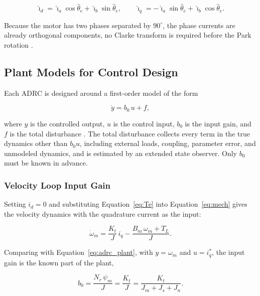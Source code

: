 \begin{equation}
	\hat{\imath}_d = \hat{\imath}_a \cos\hat{\theta}_e
	+ \hat{\imath}_b \sin\hat{\theta}_e,
	\qquad
	\hat{\imath}_q = -\hat{\imath}_a \sin\hat{\theta}_e
	+ \hat{\imath}_b \cos\hat{\theta}_e.
	\label{eq:park_measured}
\end{equation}

Because the motor has two phases separated by $90^\circ$, the phase currents are already orthogonal components, no Clarke transform is required before the Park rotation \cite{lai_modelling_2018}.

\subsection{Plant Models for Control Design}\label{sec:torque_b0}

Each ADRC is designed around a first-order model of the form

\begin{equation}
	\dot{y} = b_0\, u + f,
	\label{eq:adrc_plant}
\end{equation}

where $y$ is the controlled output, $u$ is the control input, $b_0$ is the input gain, and $f$ is the total disturbance \cite{herbst_tuning_2023}. The total disturbance collects every term in the true dynamics other than $b_0 u$, including external loads, coupling, parameter error, and unmodeled dynamics, and is estimated by an extended state observer. Only $b_0$ must be known in advance.

\subsubsection{Velocity Loop Input Gain}

Setting $i_d = 0$ and substituting Equation~\eqref{eq:Te} into Equation~\eqref{eq:mech} gives the velocity dynamics with the quadrature current as the input:

\begin{equation}
	\dot{\omega}_m
	= \frac{K_t}{J}\, i_q
	- \frac{B_m\,\omega_m + T_L}{J}.
	\label{eq:omega_dot}
\end{equation}

Comparing with Equation~\eqref{eq:adrc_plant}, with $y = \omega_m$ and $u = i_q^{*}$, the input gain is the known part of the plant,

\begin{equation}
	b_0 = \frac{N_r\,\psi_m}{J} = \frac{K_t}{J}
	= \frac{K_t}{J_m + J_s + J_n}.
	\label{eq:b0}
\end{equation}

